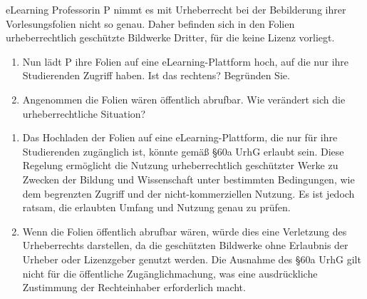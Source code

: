\documentclass{article}
\begin{document}
\begin{exercise}{eLearning}
  Professorin P nimmt es mit Urheberrecht bei der Bebilderung ihrer Vorlesungsfolien nicht so genau. Daher befinden sich in den Folien urheberrechtlich geschützte Bildwerke Dritter, für die keine Lizenz vorliegt.
  \begin{enumerate}
    \item Nun lädt P ihre Folien auf eine eLearning-Plattform hoch, auf die nur ihre Studierenden Zugriff haben. Ist das rechtens? Begründen Sie.
    \item Angenommen die Folien wären öffentlich abrufbar. Wie verändert sich die urheberrechtliche Situation?
  \end{enumerate}

  \begin{solution}
    \begin{enumerate}
      \item Das Hochladen der Folien auf eine eLearning-Plattform, die nur für ihre Studierenden zugänglich ist, könnte gemäß §60a UrhG erlaubt sein. Diese Regelung ermöglicht die Nutzung urheberrechtlich geschützter Werke zu Zwecken der Bildung und Wissenschaft unter bestimmten Bedingungen, wie dem begrenzten Zugriff und der nicht-kommerziellen Nutzung. Es ist jedoch ratsam, die erlaubten Umfang und Nutzung genau zu prüfen.
      \item Wenn die Folien öffentlich abrufbar wären, würde dies eine Verletzung des Urheberrechts darstellen, da die geschützten Bildwerke ohne Erlaubnis der Urheber oder Lizenzgeber genutzt werden. Die Ausnahme des §60a UrhG gilt nicht für die öffentliche Zugänglichmachung, was eine ausdrückliche Zustimmung der Rechteinhaber erforderlich macht.
    \end{enumerate}
  \end{solution}
\end{exercise}
\end{document}
